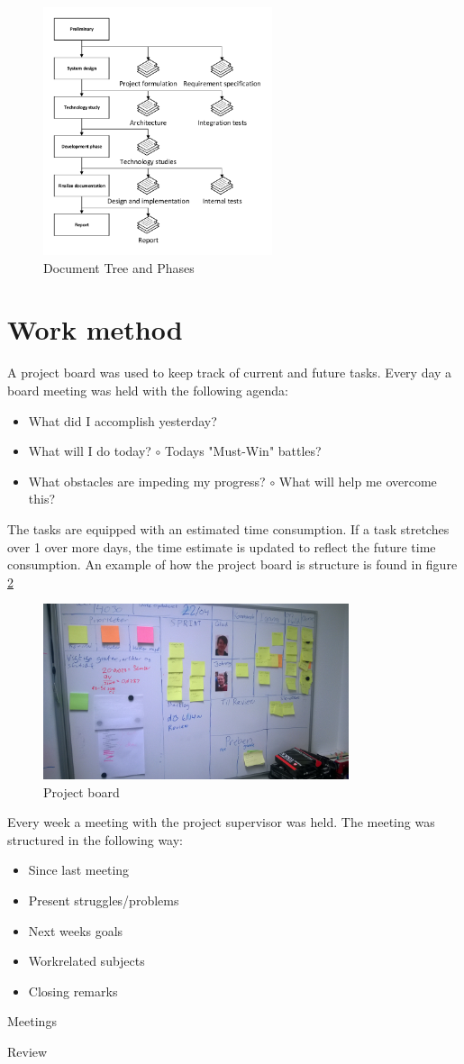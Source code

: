 \begin{figure}[H]
\centering
\includegraphics[width=0.6\textwidth]{billeder/DocumentTree}
\caption{Document Tree and Phases}
\label{fig:doctree}
\end{figure}

\section{Work method}
A project board was used to keep track of current and future tasks. Every day a board meeting was held with the following agenda:
\begin{itemize}
\item What did I accomplish yesterday?
\item What will I do today?
\subitem $\circ$ Todays "Must-Win" battles?
\item What obstacles are impeding my progress?
\subitem $\circ$ What will help me overcome this?
\end{itemize}
The tasks are equipped with an estimated time consumption. If a task stretches over 1 over more days, the time estimate is updated to reflect the future time consumption. An example of how the project board is structure is found in figure \ref{fig:prjboard}
\begin{figure}[H]
\centering
\includegraphics[width=0.8\textwidth]{billeder/board}
\caption{Project board}
\label{fig:prjboard}
\end{figure}

Every week a meeting with the project supervisor was held. The meeting was structured in the following way:
\begin{itemize}
\item Since last meeting
\item Present struggles/problems
\item Next weeks goals
\item Workrelated subjects
\item Closing remarks
\end{itemize}

Meetings

Review
